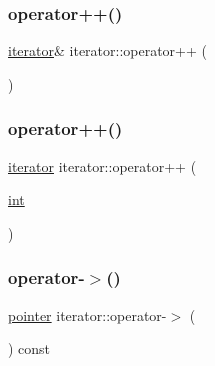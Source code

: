 \mbox{\label{classiterator_a4adf5ce6a7bb9704511805c89b79684d}} 
\subsubsection{\texorpdfstring{operator++()}{operator++()}\hspace{0.1cm}{\footnotesize\ttfamily [1/2]}}
{\footnotesize\ttfamily \mbox{\hyperlink{classiterator}{iterator}}\& iterator\+::operator++ (\begin{DoxyParamCaption}{ }\end{DoxyParamCaption})\hspace{0.3cm}{\ttfamily [inline]}}

\mbox{\label{classiterator_a49f48e4e587336b7fa48d609ee8f1779}} 
\subsubsection{\texorpdfstring{operator++()}{operator++()}\hspace{0.1cm}{\footnotesize\ttfamily [2/2]}}
{\footnotesize\ttfamily \mbox{\hyperlink{classiterator}{iterator}} iterator\+::operator++ (\begin{DoxyParamCaption}\item[{\mbox{\hyperlink{warnings_8h_a74f207b5aa4ba51c3a2ad59b219a423b}{int}}}]{ }\end{DoxyParamCaption})\hspace{0.3cm}{\ttfamily [inline]}}

\mbox{\label{classiterator_ae157ebb58c3c02e644023b31616f2491}} 
\subsubsection{\texorpdfstring{operator-\/$>$()}{operator->()}}
{\footnotesize\ttfamily \mbox{\hyperlink{classiterator_a47f6aa746357c82353203dfcbe8d8c1c}{pointer}} iterator\+::operator-\/$>$ (\begin{DoxyParamCaption}{ }\end{DoxyParamCaption}) const\hspace{0.3cm}{\ttfamily [inline]}}

